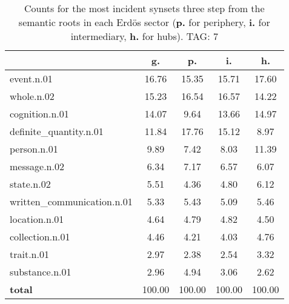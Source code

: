 \begin{table}[h!]
\begin{center}
\begin{tabular}{| l | c | c | c | c |}\hline
 & g. & p. & i. & h. \\\hline
event.n.01 & 16.76  & 15.35  & 15.71  & 17.60 \\\hline
whole.n.02 & 15.23  & 16.54  & 16.57  & 14.22 \\\hline
cognition.n.01 & 14.07  & 9.64  & 13.66  & 14.97 \\\hline
definite\_quantity.n.01 & 11.84  & 17.76  & 15.12  & 8.97 \\\hline
person.n.01 & 9.89  & 7.42  & 8.03  & 11.39 \\\hline
message.n.02 & 6.34  & 7.17  & 6.57  & 6.07 \\\hline
state.n.02 & 5.51  & 4.36  & 4.80  & 6.12 \\\hline
written\_communication.n.01 & 5.33  & 5.43  & 5.09  & 5.46 \\\hline
location.n.01 & 4.64  & 4.79  & 4.82  & 4.50 \\\hline
collection.n.01 & 4.46  & 4.21  & 4.03  & 4.76 \\\hline
trait.n.01 & 2.97  & 2.38  & 2.54  & 3.32 \\\hline
substance.n.01 & 2.96  & 4.94  & 3.06  & 2.62 \\\hline
{{\bf total}} & 100.00  & 100.00  & 100.00  & 100.00 \\\hline
\end{tabular}
\caption{Counts for the most incident synsets three step from the semantic roots in each Erd\"os sector ({\bf p.} for periphery, {\bf i.} for intermediary, {\bf h.} for hubs). TAG: 7}
\end{center}
\end{table}